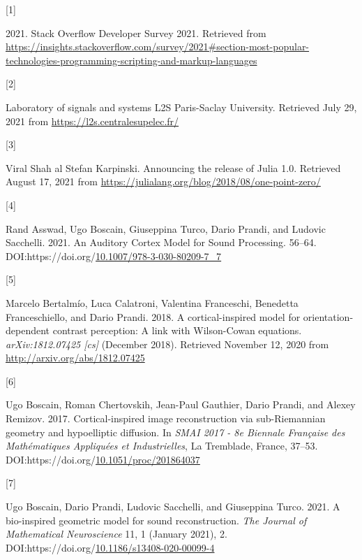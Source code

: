 \documentclass[
  american,
]{article}
\newlength{\cslhangindent}
\newlength{\csllabelwidth}
\newlength{\cslentryspacingunit} %
\newenvironment{CSLReferences}[2] %
 {%
  \setlength{\parindent}{0pt}
  \ifodd #1
  \let\oldpar\par
  \def\par{\hangindent=\cslhangindent\oldpar}
  \fi
  \setlength{\parskip}{#2\cslentryspacingunit}
 }%
 {}
\newcommand{\CSLLeftMargin}[1]{\parbox[t]{\csllabelwidth}{#1}}
\newcommand{\CSLRightInline}[1]{\parbox[t]{\linewidth - \csllabelwidth}{#1}\break}
\begin{document}
\begin{CSLReferences}{0}{0}
\leavevmode{}%
\CSLLeftMargin{{[}1{]} }
\CSLRightInline{2021. Stack {Overflow} {Developer} {Survey} 2021. Retrieved from \url{https://insights.stackoverflow.com/survey/2021\#section-most-popular-technologies-programming-scripting-and-markup-languages}}

\leavevmode{}%
\CSLLeftMargin{{[}2{]} }
\CSLRightInline{Laboratory of signals and systems {\textbar} {L2S} {\textbar} {Paris}-{Saclay} {University}. Retrieved July 29, 2021 from \url{https://l2s.centralesupelec.fr/}}

\leavevmode{}%
\CSLLeftMargin{{[}3{]} }
\CSLRightInline{Viral Shah al Stefan Karpinski. Announcing the release of {Julia} 1.0. Retrieved August 17, 2021 from \url{https://julialang.org/blog/2018/08/one-point-zero/}}

\leavevmode{}%
\CSLLeftMargin{{[}4{]} }
\CSLRightInline{Rand Asswad, Ugo Boscain, Giuseppina Turco, Dario Prandi, and Ludovic Sacchelli. 2021. An {Auditory} {Cortex} {Model} for {Sound} {Processing}. 56--64. DOI:https://doi.org/\href{https://doi.org/10.1007/978-3-030-80209-7_7}{10.1007/978-3-030-80209-7\_7}}

\leavevmode{}%
\CSLLeftMargin{{[}5{]} }
\CSLRightInline{Marcelo Bertalmío, Luca Calatroni, Valentina Franceschi, Benedetta Franceschiello, and Dario Prandi. 2018. A cortical-inspired model for orientation-dependent contrast perception: A link with {Wilson}-{Cowan} equations. \emph{arXiv:1812.07425 {[}cs{]}} (December 2018). Retrieved November 12, 2020 from \url{http://arxiv.org/abs/1812.07425}}

\leavevmode{}%
\CSLLeftMargin{{[}6{]} }
\CSLRightInline{Ugo Boscain, Roman Chertovskih, Jean-Paul Gauthier, Dario Prandi, and Alexey Remizov. 2017. Cortical-inspired image reconstruction via sub-{Riemannian} geometry and hypoelliptic diffusion. In \emph{{SMAI} 2017 - 8e {Biennale} {Française} des {Mathématiques} {Appliquées} et {Industrielles}}, La Tremblade, France, 37--53. DOI:https://doi.org/\href{https://doi.org/10.1051/proc/201864037}{10.1051/proc/201864037}}

\leavevmode{}%
\CSLLeftMargin{{[}7{]} }
\CSLRightInline{Ugo Boscain, Dario Prandi, Ludovic Sacchelli, and Giuseppina Turco. 2021. A bio-inspired geometric model for sound reconstruction. \emph{The Journal of Mathematical Neuroscience} 11, 1 (January 2021), 2. DOI:https://doi.org/\href{https://doi.org/10.1186/s13408-020-00099-4}{10.1186/s13408-020-00099-4}}


\end{CSLReferences}
\end{document}
